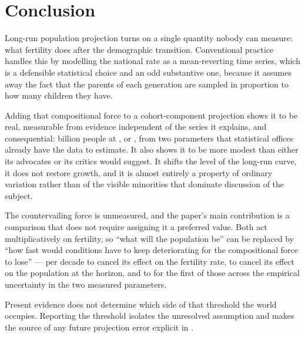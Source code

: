 \section{Conclusion}
\label{sec:conclusion}

Long-run population projection turns on a single quantity nobody can measure:
what fertility does after the demographic transition. Conventional practice
handles this by modelling the national rate as a mean-reverting time series,
which is a defensible statistical choice and an odd substantive one, because it
assumes away the fact that the parents of each generation are sampled in
proportion to how many children they have.

Adding that compositional force to a cohort-component projection shows it to be
real, measurable from evidence independent of the series it explains, and
consequential: \LadderMainstreamGain{} billion people at \ProjectionEndYear{},
or \LadderMainstreamGainPercent{}, from two parameters that statistical offices
already have the data to estimate. It also shows it to be more modest than either
its advocates or its critics would suggest. It shifts the level of the long-run
curve, it does not restore growth, and it is almost entirely a property of
ordinary variation rather than of the visible minorities that dominate discussion
of the subject.

The countervailing force is unmeasured, and the paper's main contribution is a
comparison that does not require assigning it a preferred value.
Both act multiplicatively on fertility, so ``what will the population be'' can be
replaced by ``how fast would conditions have to keep deteriorating for the
compositional force to lose'' --- \BoundaryPaired{} per decade to cancel its
effect on the fertility rate, \BoundaryPopulation{} to cancel its effect on the
population at the horizon, and \BoundaryFloor{} to \BoundaryCeiling{} for the
first of those across the empirical uncertainty in the two measured parameters.

Present evidence does not determine which side of that threshold the world
occupies. Reporting the threshold isolates the unresolved assumption and makes
the source of any future projection error explicit in .

